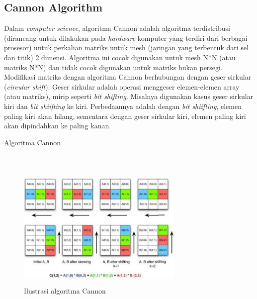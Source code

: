 \documentclass[conference]{IEEEtran}
\begin{document}
\subsection{Cannon Algorithm}
Dalam \textit{computer science}, algoritma Cannon adalah algoritma terdistribusi (dirancang untuk dilakukan pada \textit{hardware} komputer yang terdiri dari berbagai prosesor)
untuk perkalian matriks untuk mesh (jaringan yang terbentuk dari sel dan titik) 2 dimensi.
Algoritma ini cocok digunakan untuk mesh N*N (atau matriks N*N) dan tidak cocok digunakan untuk matriks bukan persegi.
Modifikasi matriks dengan algoritma Cannon berhubungan dengan geser sirkular (\textit{circular shift}).
Geser sirkular adalah operasi menggeser elemen-elemen array (atau matriks), mirip seperti \textit{bit shifting}.
Misalnya digunakan kasus geser sirkular kiri dan \textit{bit shiifting} ke kiri.
Perbedaannya adalah dengan \textit{bit shiifting}, elemen paling kiri akan hilang, 
sementara dengan geser sirkular kiri, elemen paling kiri akan dipindahkan ke paling kanan.

\begin{algorithm}
    \caption{Algoritma Cannon}
    \\
\end{algorithm}

\begin{figure}[h]
    \includegraphics[width = 8cm, height = 6cm]{Ilustrasi_algoritma_cannon.png}
    \centering
    \caption{Ilustrasi algoritma Cannon}
\end{figure}
\end{document}
